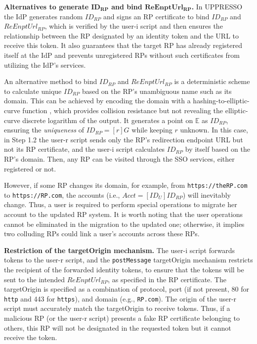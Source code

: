 \noindent \textbf{Alternatives to generate $\boldsymbol{ID_{RP}}$ and bind $\boldsymbol{ReEnptUrl_{RP}}$.}
In UPPRESSO the IdP generates random $ID_{RP}$ and signs an RP certificate to bind $ID_{RP}$ and $ReEnptUrl_{RP}$, which is verified by the user-i script
    and then ensures the relationship between the RP designated by an identity token and the URL to receive this token.
It also guarantees that the target RP has already registered itself at the IdP and prevents unregistered RPs without such certificates from utilizing the IdP's services.

An alternative method to bind $ID_{RP}$ and $ReEnptUrl_{RP}$ is
 a deterministic scheme to calculate unique $ID_{RP}$ based on the RP's unambiguous name such as its domain.
This can be achieved by encoding the domain with a hashing-to-elliptic-curve function \cite{irtf-cfrg-hash-to-curve-16}, which provides collision resistance but not revealing the elliptic-curve discrete logarithm of the output. It generates a point on $\mathbb{E}$ as $ID_{RP}$, ensuring the \emph{uniqueness} of $ID_{RP} = [r]G$ while keeping $r$ unknown. %
In this case, in Step 1.2 the user-r script sends only the RP's redirection endpoint URL but not its RP certificate, and the user-i script calculates $ID_{RP}$ by itself based on the RP's domain. 
Then, any RP can be visited through the SSO services, either registered or not.

However, if some RP changes its domain, for example, from \verb+https://theRP.com+ to \verb+https://RP.com+, the accounts (i.e., $Acct = [ID_U]ID_{RP}$) will inevitably change.
Thus, a user is required to perform special operations to migrate her account to the updated RP system.
It is worth noting that the user operations cannot be eliminated in the migration to the updated one;
otherwise, it implies two colluding RPs could link a user's accounts across these RPs.


\noindent \textbf{Restriction of the targetOrigin mechanism.}
The user-i script forwards tokens to the user-r script, and the \verb+postMessage+ targetOrigin mechanism \cite{postm-targeto} restricts the recipient of the forwarded identity tokens, to ensure that the tokens will be sent to the intended $ReEnptUrl_{RP}$, as specified in the RP certificate. The targetOrigin is specified as a combination of protocol, port (if not present, 80 for \verb+http+ and 443 for \verb+https+), and domain (e.g., \verb+RP.com+).
The origin of the user-r script must accurately match the targetOrigin to receive tokens.
Thus, if a malicious RP (or the user-r script) presents a fake RP certificate belonging to others,
this RP will not be designated in the requested token but
    it cannot receive the token.

